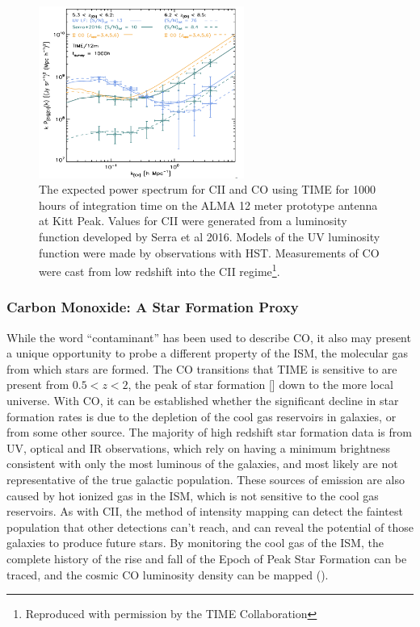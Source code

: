 \documentclass[manuscript]{aastex}
\begin{document}
\begin{figure}[H]
\centering
\captionsetup{width=0.6\textwidth}
\includegraphics[width=0.6\textwidth]{bock1.png}
\caption[The expected power spectrum for CII and CO using TIME. -()]{The expected power spectrum for CII and CO using TIME for 1000 hours of integration time on the ALMA 12 meter prototype antenna at Kitt Peak. Values for CII were generated from a luminosity function developed by Serra et al 2016. Models of the UV luminosity function were made by observations with HST. Measurements of CO were cast from low redshift into the CII regime\footnote{Reproduced with permission by the TIME Collaboration}.}
\vspace{-0.8cm}
\label{fig:coc2power}
\end{figure}

\subsubsection{Carbon Monoxide: A Star Formation Proxy}

While the word ``contaminant'' has been used to describe CO, it also may present a unique opportunity to probe a different property of the ISM, the molecular gas from which stars are formed. The CO transitions that TIME is sensitive to are present from $0.5 < z < 2$, the peak of star formation [\cite{Madau2014}] down to the more local universe.  With CO, it can be established whether the significant decline in star formation rates is due to the depletion of the cool gas reservoirs in galaxies, or from some other source. The majority of high redshift star formation data is from UV, optical and IR observations, which rely on having a minimum brightness consistent with only the most luminous of the galaxies, and most likely are not representative of the true galactic population. These sources of emission are also caused by hot ionized gas in the ISM, which is not sensitive to the cool gas reservoirs. As with CII, the method of intensity mapping can detect the faintest population that other detections can't reach, and can reveal the potential of those galaxies to produce future stars. By monitoring the cool gas of the ISM, the complete history of the rise and fall of the Epoch of Peak Star Formation can be traced, and the cosmic CO luminosity density can be mapped (\cite{Kovetz2017}). 
\end{document}

